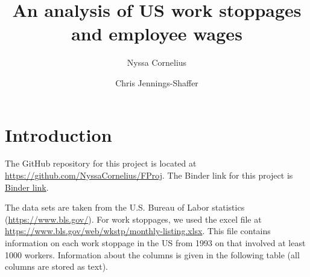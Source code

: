 \documentclass[reqno,11pt]{amsart}
\title{An analysis of US work stoppages and employee wages}
\author[N. Cornelius]{Nyssa Cornelius}
\author[C. Jennings-Shaffer]{Chris  Jennings-Shaffer}
\begin{document}
\allowdisplaybreaks
\maketitle



\section{Introduction}

The GitHub repository for this project is located at
\url{https://github.com/NyssaCornelius/FProj}. The Binder link for this project
is \href{https://mybinder.org/v2/gh/NyssaCornelius/FProj/1d4a1dfcafdd4295908e81187a725c6250760315}{Binder link}.



The data sets are taken from the U.S. Bureau of Labor statistics (\url{https://www.bls.gov/}). 
For work stoppages, we used the excel file at \url{https://www.bls.gov/web/wkstp/monthly-listing.xlsx}.
This file contains information on each work stoppage in the US from 1993 on that involved at
least 1000 workers. Information about the columns is given in the following table
(all columns are stored as text).
\end{document}
